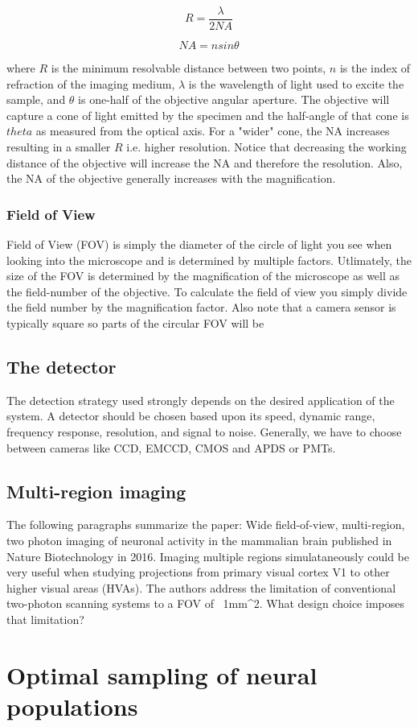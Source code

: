 \begin{equation}
R = \frac{\lambda}{2NA}
\end{equation} 

\begin{equation}
NA = nsin\theta
\end{equation}


where $R$ is the minimum resolvable distance between two points, $n$ is the index of refraction of the imaging medium, 
$\lambda$ is the wavelength of light used to excite the sample, and $\theta$ is one-half of the objective angular aperture. 
The objective will capture a cone of light emitted by the specimen and the half-angle of that cone is $theta$ as measured 
from the optical axis. For a "wider" cone, the NA increases resulting in a smaller $R$ i.e. higher resolution.
Notice that decreasing the working distance of the objective will increase the NA and therefore the resolution.
Also, the NA of the objective generally increases with the magnification.

\subsubsection{Field of View}

Field of View (FOV) is simply the diameter of the circle of light you see when looking into the microscope
and is determined by multiple factors. Utlimately, the size of the FOV is determined by the magnification of the microscope 
as well as the field-number of the objective. To calculate the field of view you simply divide the field number
by the magnification factor. Also note that a camera sensor is typically square so parts of the circular FOV will be 

\subsection{The detector}

The detection strategy used strongly depends on the desired application of the system. A detector should be chosen 
based upon its speed, dynamic range, frequency response, resolution, and signal to noise. Generally, we have to choose
between cameras like CCD, EMCCD, CMOS and APDS or PMTs. 

\subsection{Multi-region imaging}


The following paragraphs summarize the paper: Wide field-of-view, multi-region, two photon imaging of neuronal activity in the mammalian brain published
in Nature Biotechnology in 2016. Imaging multiple regions simulataneously could be very useful when studying projections from primary visual cortex
V1 to other higher visual areas (HVAs). The authors address the limitation of conventional two-photon scanning systems to a FOV of ~1mm^{2}. What 
design choice imposes that limitation? 


\section{Optimal sampling of neural populations}




